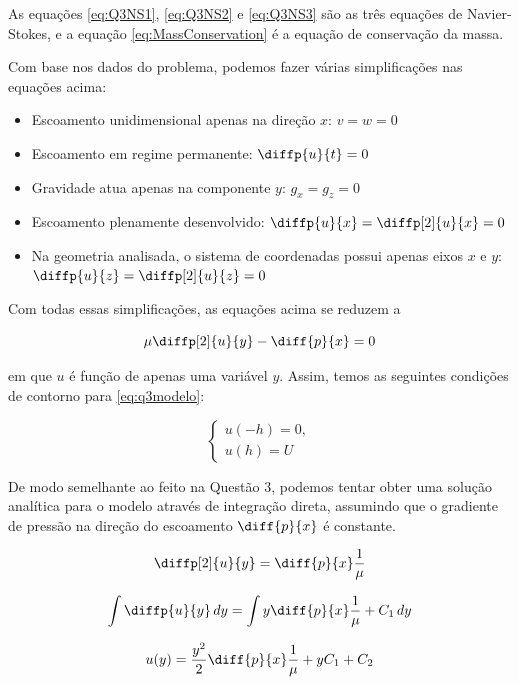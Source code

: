 As equações \eqref{eq:Q3NS1}, \eqref{eq:Q3NS2} e \eqref{eq:Q3NS3} são as três 
equações de Navier-Stokes, e a equação \eqref{eq:MassConservation} é a equação de conservação
da massa.

Com base nos dados do problema, podemos fazer várias simplificações nas equações acima:

\begin{itemize}
    \item Escoamento unidimensional apenas na direção $x$: $v = w = 0$
    \item Escoamento em regime permanente: $\diffp{u}{t} = 0$
    \item Gravidade atua apenas na componente $y$: $g_x = g_z = 0$
    \item Escoamento plenamente desenvolvido: $\diffp{u}{x} = \diffp[2]{u}{x} = 0$
    \item Na geometria analisada, o sistema de coordenadas possui apenas eixos $x$ e $y$: 
    $\diffp{u}{z} = \diffp[2]{u}{z} = 0$ 
\end{itemize}

Com todas essas simplificações, as equações acima se reduzem a 

\begin{equation}\label{eq:q3modelo}
    \mu\diffp[2]{u}{y} - \diff{p}{x} = 0
\end{equation}

\noindent em que $u$ é função de apenas uma variável $y$.
Assim, temos as seguintes condições de contorno para \eqref{eq:q3modelo}:

\begin{equation}\label{eq:q3modeloContorno}
    \begin{cases}
        u(-h) = 0, \\
        u(h) = U
    \end{cases}
\end{equation}

De modo semelhante ao feito na Questão 3, podemos tentar obter uma solução analítica
para o modelo através de integração direta, assumindo que o gradiente de pressão 
na direção do escoamento $\diff{p}{x}$ é constante.

\[ \diffp[2]{u}{y} = \diff{p}{x} \frac{1}{\mu} \]

\[ \int \diffp{u}{y} \, dy = \int y\diff{p}{x}\frac{1}{\mu} + C_1  \, dy \]

\begin{equation}\label{eq:q3solucaoGeral}
    u(y) = \frac{y^2}{2}\diff{p}{x}\frac{1}{\mu} + yC_1 + C_2 
\end{equation}

